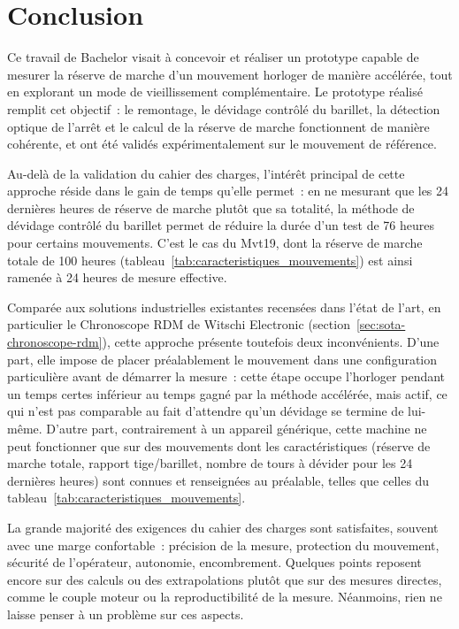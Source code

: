 \chapter{Conclusion}

Ce travail de Bachelor visait à concevoir et réaliser un prototype capable
de mesurer la réserve de marche d'un mouvement horloger de manière
accélérée, tout en explorant un mode de vieillissement complémentaire. Le
prototype réalisé remplit cet objectif~: le remontage, le dévidage contrôlé
du barillet, la détection optique de l'arrêt et le calcul de la réserve de
marche fonctionnent de manière cohérente, et ont été validés
expérimentalement sur le mouvement de référence.

Au-delà de la validation du cahier des charges, l'intérêt principal de cette
approche réside dans le gain de temps qu'elle permet~: en ne mesurant que les
24 dernières heures de réserve de marche plutôt que sa totalité, la méthode
de dévidage contrôlé du barillet permet de réduire la durée d'un test de
76 heures pour certains mouvements. C'est le cas du Mvt19, dont la réserve de
marche totale de 100 heures (tableau~\ref{tab:caracteristiques_mouvements})
est ainsi ramenée à 24 heures de mesure effective.

Comparée aux solutions industrielles existantes recensées dans l'état de
l'art, en particulier le Chronoscope RDM de Witschi Electronic
(section~\ref{sec:sota-chronoscope-rdm}), cette approche présente toutefois
deux inconvénients. D'une part, elle impose de placer préalablement le
mouvement dans une configuration particulière avant de démarrer la mesure~: cette étape occupe
l'horloger pendant un temps certes inférieur au temps gagné par la méthode accélérée, mais actif, ce qui n'est pas
comparable au fait d'attendre qu'un dévidage se termine de lui-même. D'autre part,
contrairement à un appareil générique, cette machine ne peut fonctionner que
sur des mouvements dont les caractéristiques (réserve de marche totale,
rapport tige/barillet, nombre de tours à dévider pour les 24 dernières
heures) sont connues et renseignées au préalable, telles que celles du
tableau~\ref{tab:caracteristiques_mouvements}.

La grande majorité des exigences du cahier des charges sont satisfaites,
souvent avec une marge confortable~: précision de la mesure, protection du
mouvement, sécurité de l'opérateur, autonomie, encombrement. Quelques points
reposent encore sur des calculs ou des extrapolations plutôt que sur des
mesures directes, comme le couple moteur ou la reproductibilité de la mesure.
Néanmoins, rien ne laisse penser à un problème sur ces aspects.

